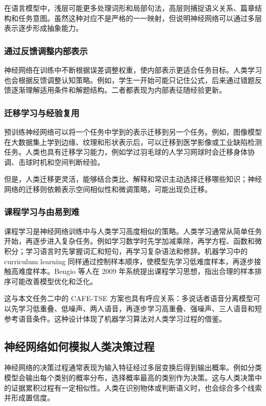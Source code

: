 \documentclass[UTF8,zihao=-4,a4paper]{ctexart}
\begin{document}
在语言模型中，浅层可能更多处理词形和局部句法，高层则捕捉语义关系、篇章结构和任务意图。虽然这种对应不是严格的一一映射，但说明神经网络可以通过多层表示逐步形成抽象能力。

\subsubsection{通过反馈调整内部表示}

神经网络在训练中不断根据误差调整权重，使内部表示更适合任务目标。人类学习也会根据反馈调整认知策略。例如，学生一开始可能只记住公式，后来通过错题反馈逐渐理解适用条件和解题结构。二者都表现为内部表征随经验更新。

\subsubsection{迁移学习与经验复用}

预训练神经网络可以将一个任务中学到的表示迁移到另一个任务。例如，图像模型在大数据集上学到边缘、纹理和形状表示后，可以迁移到医学影像或工业缺陷检测任务。人类也具有迁移学习能力，例如学过羽毛球的人学习网球时会迁移身体协调、击球时机和空间判断经验。

但是，人类迁移更灵活，能够结合类比、解释和常识主动选择迁移哪些知识；神经网络的迁移则依赖表示空间相似性和微调策略，可能出现负迁移。

\subsubsection{课程学习与由易到难}

课程学习是神经网络训练中与人类学习高度相似的策略。人类学习通常从简单任务开始，再逐步进入复杂任务。例如学习数学时先学加减乘除，再学方程、函数和微积分；学习语言时先掌握词汇和短句，再学习复杂语法和修辞。机器学习中的 curriculum learning 同样通过控制样本顺序，使模型先学习低难度样本，再逐步接触高难度样本。Bengio 等人在 2009 年系统提出课程学习思想，指出合理的样本排序可能改善模型优化和泛化\cite{bengio2009curriculum}。

这与本文任务二中的 CAFE-TSE 方案也具有呼应关系：多说话者语音分离模型可以先学习低重叠、低噪声、两人语音，再逐步学习高重叠、强噪声、三人语音和短参考语音条件。这种设计体现了机器学习算法对人类学习过程的借鉴。

\subsection{神经网络如何模拟人类决策过程}

神经网络的决策过程通常表现为输入特征经过多层变换后得到输出概率。例如分类模型会输出每个类别的概率分布，选择概率最高的类别作为决策。这与人类决策中的证据累积过程有一定相似性。人类在识别物体或判断语义时，也会综合多个线索并形成置信度。
\end{document}
